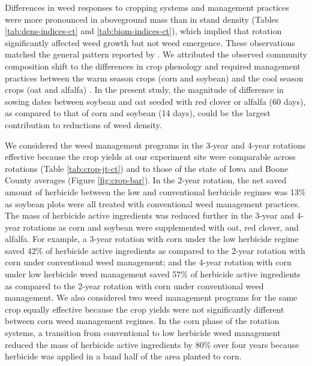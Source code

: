 \documentclass[
]{article}
\begin{document}
Differences in weed responses to cropping systems and management practices were more pronounced in aboveground mass than in stand density (Tables \ref{tab:dens-indices-ct} and \ref{tab:biom-indices-ct}), which implied that rotation significantly affected weed growth but not weed emergence. These observations matched the general pattern reported by \citet{weisbergerDoesDiversifyingCrop2019}. We attributed the observed community composition shift to the differences in crop phenology and required management practices between the warm season crops (corn and soybean) and the cool season crops (oat and alfalfa) \citep{gabaAgroecologicalWeedControl2014, weisbergerDoesDiversifyingCrop2019}. In the present study, the magnitude of difference in sowing dates between soybean and oat seeded with red clover or alfalfa (60 days), as compared to that of corn and soybean (14 days), could be the largest contribution to reductions of weed density.

We considered the weed management programs in the 3-year and 4-year rotations effective because the crop yields at our experiment site were comparable across rotations (Table \ref{tab:crop-jt-ct}) and to those of the state of Iowa and Boone County averages (Figure \ref{fig:crop-bar}). In the 2-year rotation, the net saved amount of herbicide between the low and conventional herbicide regimes was 13\% as soybean plots were all treated with conventional weed management practices. The mass of herbicide active ingredients was reduced further in the 3-year and 4-year rotations as corn and soybean were supplemented with oat, red clover, and alfalfa. For example, a 3-year rotation with corn under the low herbicide regime saved 42\% of herbicide active ingredients as compared to the 2-year rotation with corn under conventional weed management; and the 4-year rotation with corn under low herbicide weed management saved 57\% of herbicide active ingredients as compared to the 2-year rotation with corn under conventional weed management. We also considered two weed management programs for the same crop equally effective because the crop yields were not significantly different between corn weed management regimes. In the corn phase of the rotation systems, a transition from conventional to low herbicide weed management reduced the mass of herbicide active ingredients by 80\% over four years because herbicide was applied in a band half of the area planted to corn.
\end{document}
